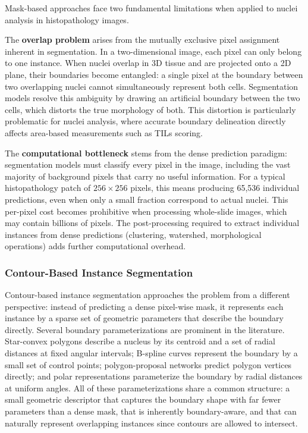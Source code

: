 
Mask-based approaches face two fundamental limitations when applied to nuclei analysis in histopathology images.

The \textbf{overlap problem} arises from the mutually exclusive pixel assignment inherent in segmentation. In a two-dimensional image, each pixel can only belong to one instance. When nuclei overlap in 3D tissue and are projected onto a 2D plane, their boundaries become entangled: a single pixel at the boundary between two overlapping nuclei cannot simultaneously represent both cells. Segmentation models resolve this ambiguity by drawing an artificial boundary between the two cells, which distorts the true morphology of both. This distortion is particularly problematic for nuclei analysis, where accurate boundary delineation directly affects area-based measurements such as TILs scoring.

The \textbf{computational bottleneck} stems from the dense prediction paradigm: segmentation models must classify every pixel in the image, including the vast majority of background pixels that carry no useful information. For a typical histopathology patch of $256 \times 256$ pixels, this means producing 65,536 individual predictions, even when only a small fraction correspond to actual nuclei. This per-pixel cost becomes prohibitive when processing whole-slide images, which may contain billions of pixels. The post-processing required to extract individual instances from dense predictions (clustering, watershed, morphological operations) adds further computational overhead.

\subsubsection{Contour-Based Instance Segmentation}
\label{sec:contour-based}

Contour-based instance segmentation approaches the problem from a different perspective: instead of predicting a dense pixel-wise mask, it represents each instance by a sparse set of geometric parameters that describe the boundary directly. Several boundary parameterizations are prominent in the literature. Star-convex polygons \cite{schmidt2018cell} describe a nucleus by its centroid and a set of radial distances at fixed angular intervals; B-spline curves \cite{mandal2020splinedist} represent the boundary by a small set of control points; polygon-proposal networks \cite{chen2023cppnet} predict polygon vertices directly; and polar representations \cite{xie2019polarmask} parameterize the boundary by radial distances at uniform angles. All of these parameterizations share a common structure: a small geometric descriptor that captures the boundary shape with far fewer parameters than a dense mask, that is inherently boundary-aware, and that can naturally represent overlapping instances since contours are allowed to intersect.

